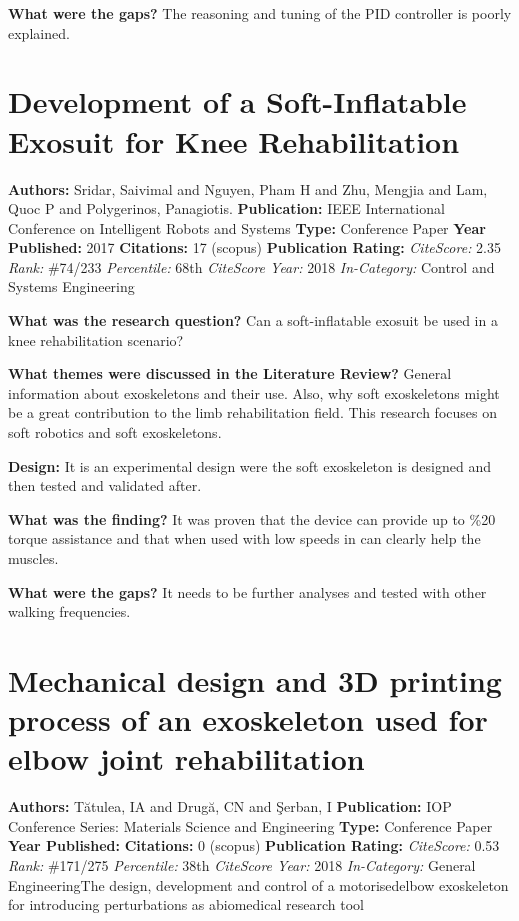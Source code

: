 \textbf{What were the gaps?}   
The reasoning and tuning of the PID controller is poorly explained. 






\section{Development of a Soft-Inflatable Exosuit for Knee Rehabilitation} 
\textbf{Authors:} Sridar, Saivimal and Nguyen, Pham H and Zhu, Mengjia and Lam, Quoc P and Polygerinos, Panagiotis. \newline
\textbf{Publication:} IEEE International Conference on Intelligent Robots and Systems
\textbf{Type:} Conference Paper \newline
\textbf{Year Published:} 2017
\textbf{Citations:} 17 (scopus) \newline 
\textbf{Publication Rating:}    
\textit{CiteScore:} 2.35 \textit{Rank:} \#74/233 \textit{Percentile:} 68th \newline
\textit{CiteScore Year:} 2018
\textit{In-Category:} Control and Systems Engineering

\textbf{What was the research question?}
Can a soft-inflatable exosuit be used in a knee rehabilitation scenario? 

\textbf{What themes were discussed in the Literature Review?}   
General information about exoskeletons and their use. Also, why soft exoskeletons might be a great contribution to the limb rehabilitation field. This research focuses on soft robotics and soft exoskeletons. 

\textbf{Design:}  
It is an experimental design were the soft exoskeleton is designed and then tested and validated after. 

\textbf{What was the finding?} 
It was proven that the device can provide up to \%20 torque assistance and that when used with low speeds in can clearly help the muscles. 

\textbf{What were the gaps?}   
It needs to be further analyses and tested with other walking frequencies. 


\section{Mechanical design and 3D printing process of an exoskeleton used for elbow joint rehabilitation}
\textbf{Authors:} T{\u{a}}tulea, IA and Drug{\u{a}}, CN and {\c{S}}erban, I  \newline
\textbf{Publication:} IOP Conference Series: Materials Science and Engineering
\textbf{Type:} Conference Paper \newline
\textbf{Year Published:} 
\textbf{Citations:} 0 (scopus) \newline 
\textbf{Publication Rating:}    
\textit{CiteScore:} 0.53  \textit{Rank:} \#171/275 \textit{Percentile:} 38th \newline
\textit{CiteScore Year:} 2018
\textit{In-Category:} General EngineeringThe design, development and control of a motorisedelbow exoskeleton for introducing perturbations as abiomedical research tool 

